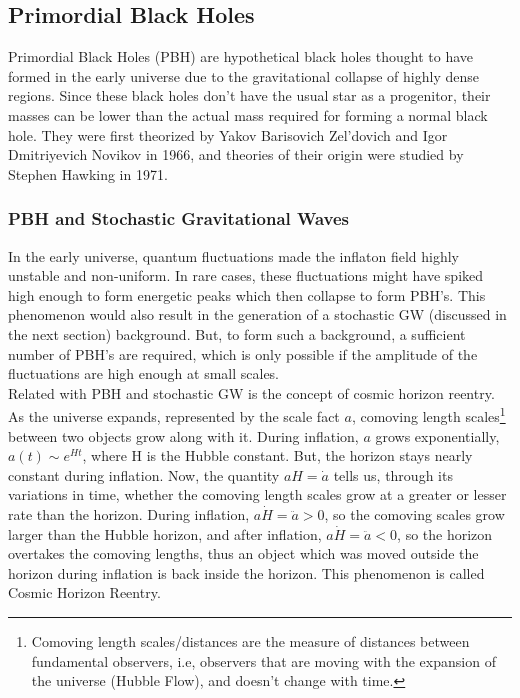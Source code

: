 \subsection{Primordial Black Holes}
Primordial Black Holes (PBH) are hypothetical black holes thought to have formed in the early universe due to the gravitational collapse of highly dense regions. Since these black holes don't have the usual star as a progenitor, their masses can be lower than the actual mass required for forming a normal black hole. They were first theorized by Yakov Barisovich Zel'dovich and Igor Dmitriyevich Novikov in 1966, and theories of their origin were studied by Stephen Hawking in 1971. \cite{PBH_defn}

\subsubsection{PBH and Stochastic Gravitational Waves}
In the early universe, quantum fluctuations made the inflaton field highly unstable and non-uniform. In rare cases, these fluctuations might have spiked high enough to form energetic peaks which then collapse to form PBH's. This phenomenon would also result in the generation of a stochastic GW (discussed in the next section) background. But, to form such a background, a sufficient number of PBH's are required, which is only possible if the amplitude of the fluctuations are high enough at small scales. \cite{Nakama_2017}\\

Related with PBH and stochastic GW is the concept of cosmic horizon reentry. As the universe expands, represented by the scale fact $a$, comoving length scales\footnote{Comoving length scales/distances are the measure of distances between fundamental observers, i.e, observers that are moving with the expansion of the universe (Hubble Flow), and doesn't change with time.}  between two objects grow along with it. During inflation, $a$ grows exponentially, $a(t) \sim e^{Ht}$, where H is the Hubble constant. But, the horizon stays nearly constant during inflation. Now, the quantity $aH = \dot{a}$ tells us, through its variations in time, whether the comoving length scales grow at a greater or lesser rate than the horizon. During inflation, $a\dot{H} = \ddot{a} > 0$, so the comoving scales grow larger than the Hubble horizon, and after inflation, $a\dot{H} = \ddot{a} < 0$, so the horizon overtakes the comoving lengths, thus an object which was moved outside the horizon during inflation is back inside the horizon. This phenomenon is called Cosmic Horizon Reentry.\\

